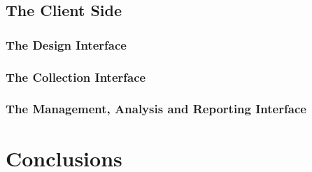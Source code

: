		\subsection{The Client Side}\label{sec:cawiSystem:clientSide}
			
			\subsubsection{The Design Interface}\label{sec:cawiSystem:designInterface}
				
			\subsubsection{The Collection Interface}
				
			\subsubsection{The Management, Analysis and Reporting Interface}
				

	\section{Conclusions}\label{sec:cawiSystem:conclusion}
		

